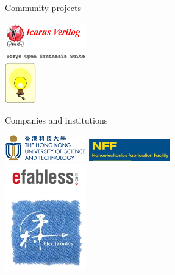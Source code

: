 \documentclass{beamer}
\begin{document}
\begin{frame}{Community projects}
	\begin{center}
		\includegraphics[width=100pt]{Icarus.png} \\
		\includegraphics[width=100pt]{Yosys.png} \\
		\includegraphics[height=50pt]{Opencircuit.png}
	\end{center}
\end{frame}

\begin{frame}{Companies and institutions}
	\begin{center}
		\includegraphics[width=100pt]{HKUST_Logo.png}
		\includegraphics[width=100pt]{NFF.jpg}  \\
		\includegraphics[width=100pt]{efabless_logo.png} \\
		\includegraphics[width=100pt]{Lanceville.png}
	\end{center}
\end{frame}



\section[Conclusion]{}
\end{document}
